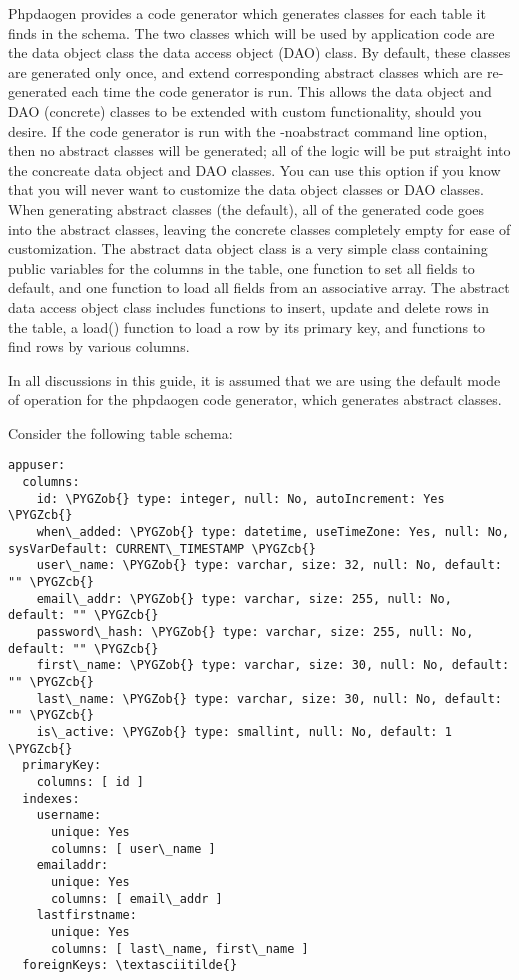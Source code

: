 \documentclass[letterpaper,10pt,english]{sphinxmanual}
\def\PYGZob{\char`\{}
\def\PYGZcb{\char`\}}
\begin{document}
Phpdaogen provides a code generator which generates classes for each table it finds in the schema.
The two classes which will be used by application code are the data object class the data access
object (DAO) class.  By default, these classes are generated only once, and extend corresponding
abstract classes which are re-generated each time the code generator is run.  This allows the data
object and DAO (concrete) classes to be extended with custom functionality, should you desire.  If
the code generator is run with the -noabstract command line option, then no abstract classes will be
generated; all of the logic will be put straight into the concreate data object and DAO classes.
You can use this option if you know that you will never want to customize the data object classes or
DAO classes.  When generating abstract classes (the default), all of the generated code goes into
the abstract classes, leaving the concrete classes completely empty for ease of customization.  The
abstract data object class is a very simple class containing public variables for the columns in the
table, one function to set all fields to default, and one function to load all fields from an
associative array.  The abstract data access object class includes functions to insert, update and
delete rows in the table, a load() function to load a row by its primary key, and functions to find
rows by various columns.

In all discussions in this guide, it is assumed that we are using the default mode of operation for
the phpdaogen code generator, which generates abstract classes.

Consider the following table schema:

\begin{Verbatim}[commandchars=\\\{\}]
appuser:
  columns:
    id: \PYGZob{} type: integer, null: No, autoIncrement: Yes \PYGZcb{}
    when\_added: \PYGZob{} type: datetime, useTimeZone: Yes, null: No, sysVarDefault: CURRENT\_TIMESTAMP \PYGZcb{}
    user\_name: \PYGZob{} type: varchar, size: 32, null: No, default: "" \PYGZcb{}
    email\_addr: \PYGZob{} type: varchar, size: 255, null: No, default: "" \PYGZcb{}
    password\_hash: \PYGZob{} type: varchar, size: 255, null: No, default: "" \PYGZcb{}
    first\_name: \PYGZob{} type: varchar, size: 30, null: No, default: "" \PYGZcb{}
    last\_name: \PYGZob{} type: varchar, size: 30, null: No, default: "" \PYGZcb{}
    is\_active: \PYGZob{} type: smallint, null: No, default: 1 \PYGZcb{}
  primaryKey:
    columns: [ id ]
  indexes:
    username:
      unique: Yes
      columns: [ user\_name ]
    emailaddr:
      unique: Yes
      columns: [ email\_addr ]
    lastfirstname:
      unique: Yes
      columns: [ last\_name, first\_name ]
  foreignKeys: \textasciitilde{}
\end{Verbatim}
\end{document}
